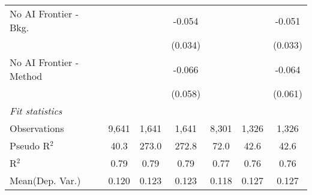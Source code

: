 \begin{tabular}{lcccccc}
   No AI Frontier - Bkg.   &         &              & -0.054  &         &              & -0.051\\   
                           &         &              & (0.034) &         &              & (0.033)\\   
   No AI Frontier - Method &         &              & -0.066  &         &              & -0.064\\   
                           &         &              & (0.058) &         &              & (0.061)\\   
   \midrule
   \emph{Fit statistics}\\
   Observations            & 9,641   & 1,641        & 1,641   & 8,301   & 1,326        & 1,326\\  
   Pseudo R$^2$            & 40.3    & 273.0        & 272.8   & 72.0    & 42.6         & 42.6\\  
   R$^2$                   & 0.79    & 0.79         & 0.79    & 0.77    & 0.76         & 0.76\\  
Mean(Dep. Var.) & 0.120 & 0.123 & 0.123 & 0.118 & 0.127 & 0.127 \\
   

\end{tabular}
